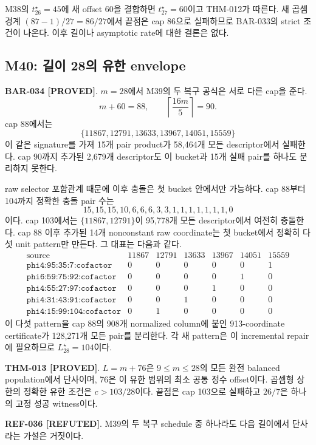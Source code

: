 \documentclass[11pt]{article}
\newcommand{\claimstatus}[2]{\textbf{#1 [#2]}}
\begin{document}
M38의 \(t_{26}^\star=45\)에 새 offset 60을 결합하면
\(t_{27}^\star=60\)이고 THM-012가 따른다. 새 곱셈 경계
\((87-1)/27=86/27\)에서 끝점은 cap 86으로 실패하므로 BAR-033의
strict 조건이 나온다. 이후 길이나 asymptotic rate에 대한 결론은
없다.

\subsection{M40: 길이 28의 유한 envelope}

\claimstatus{BAR-034}{PROVED}.
\(m=28\)에서 M39의 두 복구 공식은 서로 다른 cap을 준다.
\[
m+60=88,\qquad
\left\lceil\frac{16m}{5}\right\rceil=90.
\]
cap 88에서는
\[
\{11867,12791,13633,13967,14051,15559\}
\]
이 같은 signature를 가져 15개 pair product가 58,464개 모든
descriptor에서 실패한다. cap 90까지 추가된 2,679개 descriptor도
이 bucket과 15개 실패 pair를 하나도 분리하지 못한다.

raw selector 포함관계 때문에 이후 충돌은 첫 bucket 안에서만
가능하다. cap 88부터 104까지 정확한 충돌 pair 수는
\[
15,15,15,10,6,6,6,3,3,1,1,1,1,1,1,1,0
\]
이다. cap 103에서는 \(\{11867,12791\}\)이 95,778개 모든
descriptor에서 여전히 충돌한다. cap 88 이후 추가된 14개
nonconstant raw coordinate는 첫 bucket에서 정확히 다섯 unit
pattern만 만든다. 그 대표는 다음과 같다.
\[
\begin{array}{c|rrrrrr}
\text{source}&11867&12791&13633&13967&14051&15559\\
\hline
\texttt{phi4:95:35:7:cofactor}&0&0&0&0&0&1\\
\texttt{phi6:59:75:92:cofactor}&0&0&0&0&1&0\\
\texttt{phi4:55:27:97:cofactor}&0&0&0&1&0&0\\
\texttt{phi4:31:43:91:cofactor}&0&0&1&0&0&0\\
\texttt{phi4:15:99:104:cofactor}&0&1&0&0&0&0
\end{array}
\]
이 다섯 pattern을 cap 88의 908개 normalized column에 붙인
913-coordinate certificate가 128,271개 모든 pair를 분리한다.
각 새 pattern은 이 incremental repair에 필요하므로
\(L_{28}^\star=104\)이다.

\claimstatus{THM-013}{PROVED}.
\(L=m+76\)은 \(9\le m\le28\)의 모든 완전 balanced population에서
단사이며, 76은 이 유한 범위의 최소 공통 정수 offset이다. 곱셈형
상한의 정확한 유한 조건은 \(c>103/28\)이다. 끝점은 cap 103으로
실패하고 \(26/7\)은 하나의 고정 성공 witness이다.

\claimstatus{REF-036}{REFUTED}.
M39의 두 복구 schedule 중 하나라도 다음 길이에서 단사라는 가설은
거짓이다.
\end{document}
